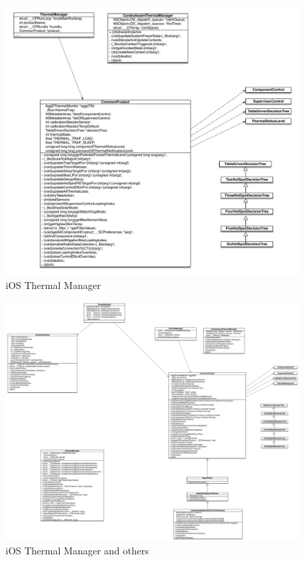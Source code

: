 \documentclass{beamer}
\begin{document}
\begin{frame}
  \begin{figure}
    \includegraphics[height=.8\textheight,keepaspectratio]{ios-thermal-manager.pdf}
    \caption{iOS Thermal Manager}
  \end{figure}
\end{frame}

\begin{frame}
  \begin{figure}
    \includegraphics[height=.8\textheight,keepaspectratio]{ios-thermal-manager-more.pdf}
    \caption{iOS Thermal Manager and others}
  \end{figure}
\end{frame}
\end{document}
